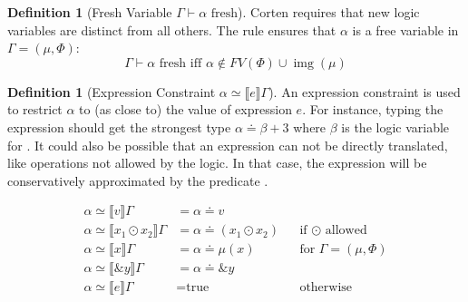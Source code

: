 \documentclass[twoside, english]{sdqthesis}
\newcommand{\bbracket}[1]{\llbracket #1 \rrbracket}
\DeclareMathOperator{\img}{img}
\theoremstyle{definition}
\newtheorem{definition}[theorem]{Definition}
\begin{document}
\begin{definition}[Fresh Variable $\Gamma \vdash \alpha \text{ fresh}$]

Corten requires that new logic variables are distinct from all others. The rule ensures that $\alpha$ is a free variable in $\Gamma = (\mu, \Phi)$:
  $$\Gamma \vdash \alpha \text{ fresh} \text{ iff } \alpha \notin FV(\Phi) \cup \img(\mu)$$
\end{definition}

\begin{definition}[Expression Constraint $\alpha \simeq \bbracket{e}\Gamma$]
An expression constraint is used to restrict $\alpha$ to (as close to) the value of expression $e$. For instance, typing the expression  should get the strongest type $\alpha \doteq \beta + 3$ where $\beta$ is the logic variable for .
It could also be possible that an expression can not be directly translated, like operations not allowed by the logic. In that case, the expression will be conservatively approximated by the predicate .

\begin{align*}
  \alpha \simeq \bbracket{v}\Gamma &= \alpha \doteq v
  \\ \alpha \simeq \bbracket{x_1 \odot x_2}\Gamma &= \alpha \doteq (x_1 \odot x_2) && \text{if }\odot\text{ allowed}
  \\ \alpha \simeq \bbracket{x}\Gamma &= \alpha \doteq \mu(x) && \text{for }\Gamma = (\mu, \Phi)
  \\ \alpha \simeq \bbracket{\&y}\Gamma &= \alpha \doteq \&y
  \\ \alpha \simeq \bbracket{e}\Gamma &= \text{true} && \text{otherwise}
\end{align*}
\end{definition}
\end{document}
